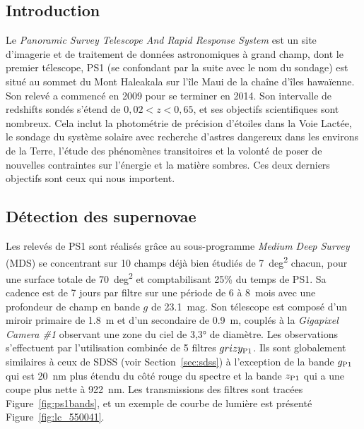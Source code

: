 \documentclass[../main/main.tex]{subfiles}
\begin{document}
\subsection{Introduction}\label{ssec:ps1intro}

Le \textit{Panoramic Survey Telescope And Rapid Response System}
\citep[Pan-STARRS,][]{chambers2016, scolnic2018} est un site d'imagerie et de
traitement de données astronomiques à grand champ, dont le premier télescope,
PS1 (se confondant par la suite avec le nom du sondage) est situé au sommet du
Mont Haleakala sur l'île Maui de la chaîne d'îles hawaïenne. Son relevé a
commencé en 2009 pour se terminer en 2014. Son intervalle de redshifts sondés
s'étend de $0,02 < z < 0,65$, et ses objectifs scientifiques sont nombreux. Cela
inclut la photométrie de précision d'étoiles dans la Voie Lactée, le sondage du
système solaire avec recherche d'astres dangereux dans les environs de la Terre,
l'étude des phénomènes transitoires et la volonté de poser de nouvelles
contraintes sur l'énergie et la matière sombres. Ces deux derniers objectifs
sont ceux qui nous importent. 

\subsection{Détection des supernovae}\label{ssec:ps1detec}

Les relevés de PS1 sont réalisés grâce au sous-programme \textit{Medium Deep
Survey} (MDS) se concentrant sur 10 champs déjà bien étudiés de \SI{7}{deg^2}
chacun, pour une surface totale de \SI{70}{deg^2} et comptabilisant 25\% du
temps de PS1. Sa cadence est de 7 jours par filtre sur une période de 6 à
\SI{8}{mois} avec une profondeur de champ en bande $g$ de \SI{23,1}{mag}. Son
télescope \citep{hodapp2004} est composé d'un miroir primaire de \SI{1,8}{m} et
d'un secondaire de \SI{0,9}{m}, couplés à la \textit{Gigapixel Camera \#1}
\citep[GPC1,][]{kaiser2010, tonry2006} observant une zone du ciel de \ang{3,3;;}
de diamètre. Les observations s'effectuent par l'utilisation combinée de 5
filtres $grizy_{\rm P1}$. Ils sont globalement similaires à ceux de SDSS (voir
Section~\ref{sec:sdss}) à l'exception de la bande $g_{\rm P1}$ qui est
\SI{20}{nm} plus étendu du côté rouge du spectre et la bande $z_{\rm P1}$ qui a
une coupe plus nette à \SI{922}{nm}. Les transmissions des filtres sont tracées
Figure~\ref{fig:ps1bands}, et un exemple de courbe de lumière est présenté
Figure~\ref{fig:lc_550041}.
\end{document}
